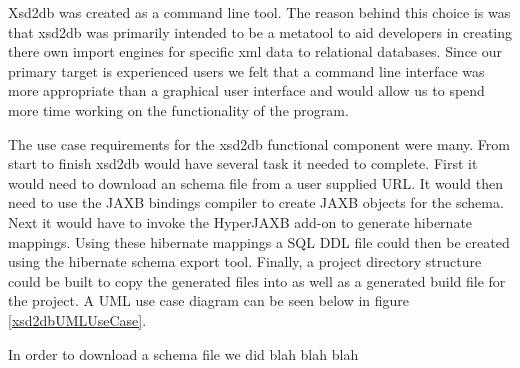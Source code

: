 Xsd2db was created as a command line tool.  The reason behind this choice is was that xsd2db was primarily intended to be a metatool to aid developers in creating there own import engines for specific xml data to relational databases.  Since our primary target is experienced users we felt that a command line interface was more appropriate than a graphical user interface and would allow us to spend more time working on the functionality of the program.    

The use case requirements for the xsd2db functional component were many.  From start to finish xsd2db would have several task it needed to complete.  First it would need to download an schema file from a user supplied URL.  It would then need to use the JAXB bindings compiler to create JAXB objects for the schema.  Next it would have to invoke the HyperJAXB add-on to generate hibernate mappings.  Using these hibernate mappings a SQL DDL file could then be created using the hibernate schema export tool.  Finally, a project directory structure could be built to copy the generated files into as well as a generated build file for the project.  A UML use case diagram can be seen below in figure \ref{xsd2dbUMLUseCase}.

In order to download a schema file we did blah blah blah 


